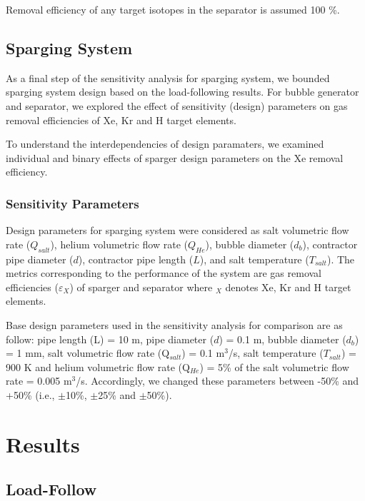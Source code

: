     Removal efficiency of any target isotopes in the separator is assumed 100 \%.

\subsection{Sparging System}

    As a final step of the sensitivity analysis for sparging system, we bounded
    sparging system design based on the load-following results.  For bubble
    generator and separator, we explored the effect of sensitivity (design)
    parameters on gas removal efficiencies of Xe, Kr and H target elements.

    To understand the interdependencies of design paramaters, we examined individual and binary effects of sparger design parameters on the Xe removal efficiency.

\subsubsection{Sensitivity Parameters}

    Design parameters for sparging system were considered as salt volumetric
    flow rate ($Q_{salt}$), helium volumetric flow rate ($Q_{He}$), bubble
    diameter ($d_b$), contractor pipe diameter ($d$), contractor pipe length
    ($L$), and salt temperature ($T_{salt}$). The metrics corresponding to the
    performance of the system are gas removal efficiencies ($\varepsilon$$_{X}$)
    of sparger and separator where $_{X}$ denotes Xe, Kr and H target elements.

    Base design parameters used in the sensitivity analysis for comparison are
    as follow: pipe length (L) = 10 m, pipe diameter ($d$) = 0.1 m, bubble
    diameter ($d_b$) = 1 mm, salt volumetric flow rate (Q$_{salt}$) = 0.1
    m$^{3}$/s, salt temperature ($T_{salt}$) = 900 K and helium volumetric flow
    rate (Q$_{He}$) = 5\% of the salt volumetric flow rate = 0.005 m$^{3}$/s.
    Accordingly, we changed these parameters between -50\% and +50\% (i.e.,
    $\pm$10\%, $\pm$25\% and $\pm$50\%).

\newpage
\FloatBarrier

\section{Results}

\subsection{Load-Follow}

